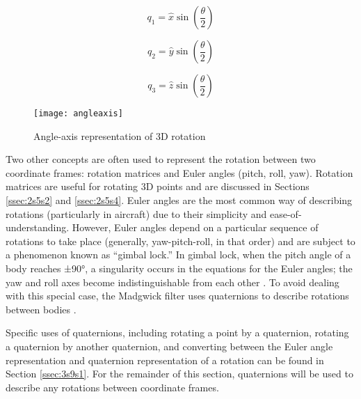 \documentclass[11pt]{ucthesisCP}
\begin{document}
\begin{equation} \label{eq:q1}
q_1 = \hat{x} \sin\left(\frac{\theta}{2}\right)
\end{equation}

\begin{equation} \label{eq:q2}
q_2 = \hat{y} \sin\left(\frac{\theta}{2}\right)
\end{equation}

\begin{equation} \label{eq:q3}
q_3 = \hat{z} \sin\left(\frac{\theta}{2}\right)
\end{equation}

\begin{figure}[htbp]
\centering
\texttt{[image: angleaxis]}
\caption{Angle-axis representation of 3D rotation \cite{quaternionuse}}
\label{fig:angleaxis}
\end{figure}

Two other concepts are often used to represent the rotation between two coordinate frames: rotation matrices and Euler angles (pitch, roll, yaw). Rotation matrices are useful for rotating 3D points and are discussed in Sections \ref{ssec:2s5s2} and \ref{ssec:2s5s4}. Euler angles are the most common way of describing rotations (particularly in aircraft) due to their simplicity and ease-of-understanding. However, Euler angles depend on a particular sequence of rotations to take place (generally, yaw-pitch-roll, in that order) and are subject to a phenomenon known as “gimbal lock.” In gimbal lock, when the pitch angle of a body reaches ±90°, a singularity occurs in the equations for the Euler angles; the yaw and roll axes become indistinguishable from each other \cite{quaternionuse}. To avoid dealing with this special case, the Madgwick filter uses quaternions to describe rotations between bodies \cite{madgwick}.

Specific uses of quaternions, including rotating a point by a quaternion, rotating a quaternion by another quaternion, and converting between the Euler angle representation and quaternion representation of a rotation can be found in Section \ref{ssec:3s9s1}. For the remainder of this section, quaternions will be used to describe any rotations between coordinate frames.
\end{document}
